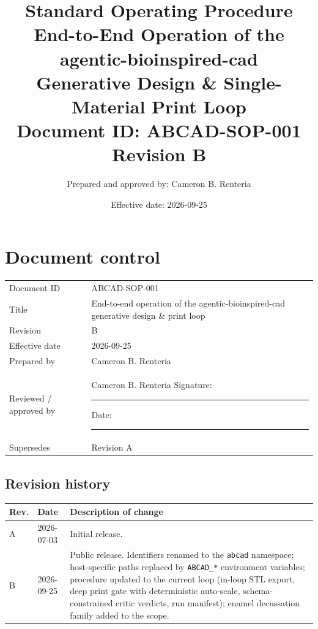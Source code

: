 \documentclass[11pt]{article}
\title{\textbf{Standard Operating Procedure}\\[4pt]
\Large End-to-End Operation of the agentic-bioinspired-cad\\ Generative Design \& Single-Material Print Loop\\[6pt]
\normalsize Document ID: ABCAD-SOP-001 \quad Revision B}
\author{Prepared and approved by: Cameron B. Renteria}
\date{Effective date: 2026-09-25}
\begin{document}
\sloppy
\setlength{\emergencystretch}{3em}
\maketitle
\thispagestyle{fancy}

\section*{Document control}
\begin{tabularx}{\linewidth}{@{}lX@{}}
\toprule
Document ID & ABCAD-SOP-001 \\
Title & End-to-end operation of the agentic-bioinspired-cad generative design \& print loop \\
Revision & B \\
Effective date & 2026-09-25 \\
Prepared by & Cameron B. Renteria \\
Reviewed / approved by & Cameron B. Renteria \hfill Signature: \rule{2.8cm}{0.3pt} \quad Date: \rule{1.8cm}{0.3pt} \\
Supersedes & Revision A \\
\bottomrule
\end{tabularx}

\subsection*{Revision history}
\begin{tabularx}{\linewidth}{@{}llX@{}}
\toprule
Rev. & Date & Description of change \\
\midrule
A & 2026-07-03 & Initial release. \\
B & 2026-09-25 & Public release. Identifiers renamed to the \texttt{abcad} namespace; host-specific paths
replaced by \texttt{ABCAD\_*} environment variables; procedure updated to the current loop (in-loop STL
export, deep print gate with deterministic auto-scale, schema-constrained critic verdicts, run manifest);
enamel decussation family added to the scope. \\
\bottomrule
\end{tabularx}

\end{document}
